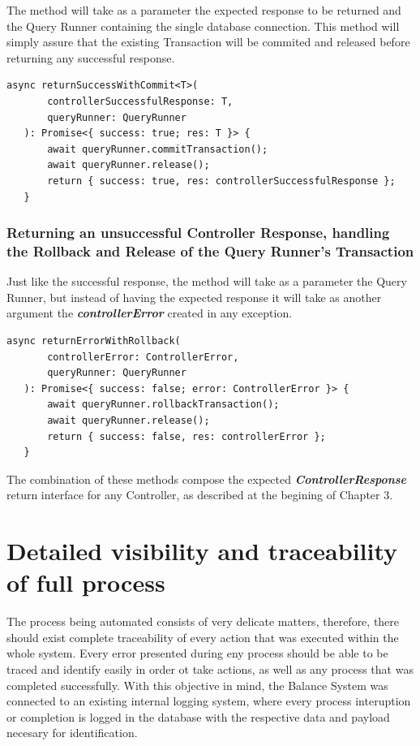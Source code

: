 The method will take as a parameter the expected response to be returned and the Query Runner containing the single database connection. This method will simply assure that the existing Transaction will be commited and released before returning any successful response.

\begin{verbatim}
async returnSuccessWithCommit<T>(
       controllerSuccessfulResponse: T,
       queryRunner: QueryRunner
   ): Promise<{ success: true; res: T }> {
       await queryRunner.commitTransaction();
       await queryRunner.release();
       return { success: true, res: controllerSuccessfulResponse };
   }
\end{verbatim}

\subsubsection{Returning an unsuccessful Controller Response, handling the Rollback and Release of the Query Runner's Transaction}


Just like the successful response, the method will take as a parameter the Query Runner, but instead of having the expected response it will take as another argument the \textbf{\textit{controllerError}} created in any exception.

\begin{verbatim}
async returnErrorWithRollback(
       controllerError: ControllerError,
       queryRunner: QueryRunner
   ): Promise<{ success: false; error: ControllerError }> {
       await queryRunner.rollbackTransaction();
       await queryRunner.release();
       return { success: false, res: controllerError };
   }
\end{verbatim}

The combination of these methods compose the expected \textbf{\textit{ControllerResponse}} return interface for any Controller, as described at the begining of Chapter 3.

\section{Detailed visibility and traceability of full process}

The process being automated consists of very delicate matters, therefore, there should exist complete traceability of every action that was executed within the whole system. Every error presented during eny process should be able to be traced and identify easily in order ot take actions, as well as any process that was completed successfully. With this objective in mind, the Balance System was connected to an existing internal logging system, where every process interuption or completion is logged in the database with the respective data and payload necesary for identification.\\

